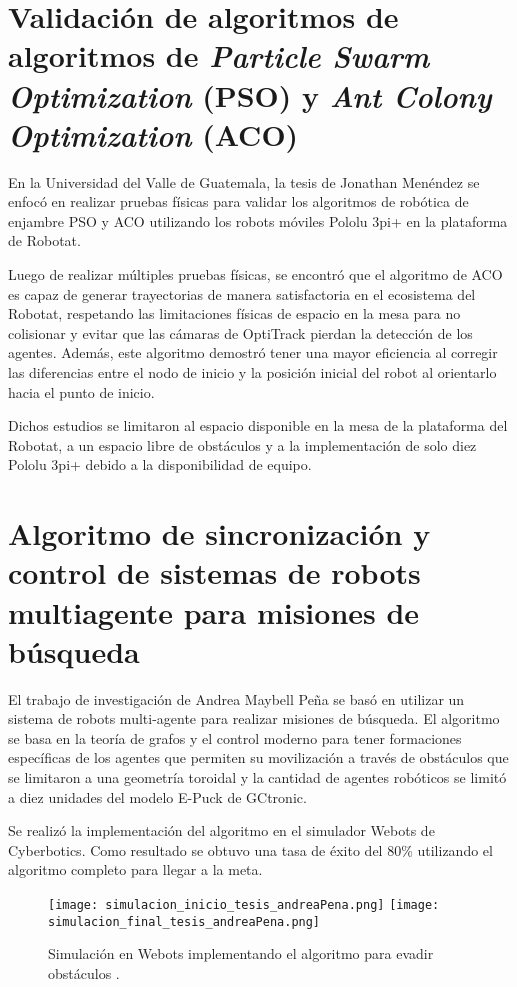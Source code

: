 \section{Validación de algoritmos de algoritmos de \textit{Particle Swarm Optimization} (PSO) y \textit{Ant Colony Optimization} (ACO)}
En la Universidad del Valle de Guatemala, la tesis de Jonathan Menéndez \cite{MenendezJ_2023_tesis} se enfocó en realizar pruebas físicas para validar los algoritmos de robótica de enjambre PSO y ACO utilizando los robots móviles Pololu 3pi+ en la plataforma de Robotat. 

Luego de realizar múltiples pruebas físicas, se encontró que el algoritmo de ACO es capaz de generar trayectorias de manera satisfactoria en el ecosistema del Robotat, respetando las limitaciones físicas de espacio en la mesa para no colisionar y evitar que las cámaras de OptiTrack pierdan la detección de los agentes. Además, este algoritmo demostró tener una mayor eficiencia al corregir las diferencias entre el nodo de inicio y la posición inicial del robot al orientarlo hacia el punto de inicio. 

Dichos estudios se limitaron al espacio disponible en la mesa de la plataforma del Robotat, a un espacio libre de obstáculos y a la implementación de solo diez Pololu 3pi+ debido a la disponibilidad de equipo. 

\section{Algoritmo de sincronización y control de sistemas de robots multiagente para misiones de búsqueda}
El trabajo de investigación de Andrea Maybell Peña \cite{PenaAM_2019_tesis} se basó en utilizar un sistema de robots multi-agente para realizar misiones de búsqueda. El algoritmo se basa en la teoría de grafos y el control moderno para tener formaciones específicas de los agentes que permiten su movilización a través de obstáculos que se limitaron a una geometría toroidal y la cantidad de agentes robóticos se limitó a diez unidades del modelo E-Puck de GCtronic.

Se realizó la implementación del algoritmo en el simulador Webots de Cyberbotics. Como resultado se obtuvo una tasa de éxito del 80\% utilizando el algoritmo completo para llegar a la meta.

\begin{figure}[H]
	\centering
	\texttt{[image: simulacion\_inicio\_tesis\_andreaPena.png]} \texttt{[image: simulacion\_final\_tesis\_andreaPena.png]}
	\caption{Simulación en Webots implementando el algoritmo para evadir obstáculos \cite{imgRobotat}.}
	\label{fig:tesis_andreaPena}
\end{figure}

